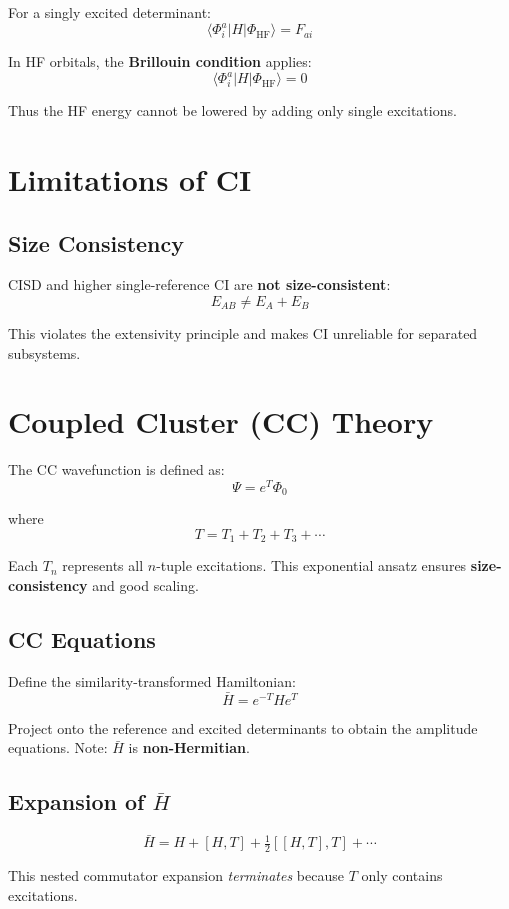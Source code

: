 \documentclass[12pt]{article}
\begin{document}
For a singly excited determinant:
\[
\langle \Phi_i^a | H | \Phi_{\mathrm{HF}} \rangle = F_{ai}
\]

In HF orbitals, the \textbf{Brillouin condition} applies:
\[
\langle \Phi_i^a | H | \Phi_{\mathrm{HF}} \rangle = 0
\]

Thus the HF energy cannot be lowered by adding only single excitations.

\section{Limitations of CI}

\subsection{Size Consistency}

CISD and higher single-reference CI are \textbf{not size-consistent}:
\[
E_{AB} \neq E_A + E_B
\]

This violates the extensivity principle and makes CI unreliable for separated subsystems.

\section{Coupled Cluster (CC) Theory}

The CC wavefunction is defined as:
\[
\Psi = e^T \Phi_0
\]

where
\[
T = T_1 + T_2 + T_3 + \cdots
\]

Each \(T_n\) represents all \(n\)-tuple excitations.
This exponential ansatz ensures \textbf{size-consistency} and good scaling.

\subsection{CC Equations}

Define the similarity-transformed Hamiltonian:
\[
\bar{H} = e^{-T} H e^T
\]

Project onto the reference and excited determinants to obtain the amplitude equations.
Note: \(\bar{H}\) is \textbf{non-Hermitian}.

\subsection{Expansion of \(\bar{H}\)}

\[
\bar{H} = H + [H, T] + \tfrac{1}{2} [[H, T], T] + \cdots
\]

This nested commutator expansion \textit{terminates} because \(T\) only contains excitations.
\end{document}
